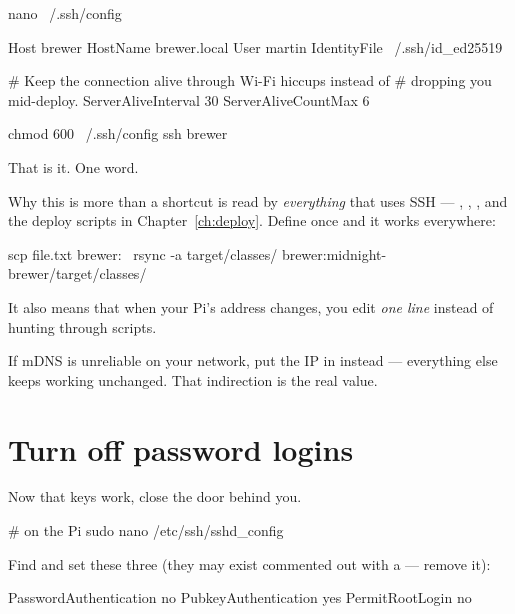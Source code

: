 \begin{shell}
nano ~/.ssh/config
\end{shell}

\begin{trace}
Host brewer
    HostName brewer.local
    User martin
    IdentityFile ~/.ssh/id_ed25519

    # Keep the connection alive through Wi-Fi hiccups instead of
    # dropping you mid-deploy.
    ServerAliveInterval 30
    ServerAliveCountMax 6
\end{trace}

\begin{shell}
chmod 600 ~/.ssh/config
ssh brewer
\end{shell}

That is it. One word.

\begin{concept}{Why this is more than a shortcut}
 is read by \emph{everything} that uses SSH ---
, , , and the deploy scripts in
Chapter~\ref{ch:deploy}. Define  once and it works everywhere:

\begin{shell}
scp file.txt brewer:~
rsync -a target/classes/ brewer:midnight-brewer/target/classes/
\end{shell}

It also means that when your Pi's address changes, you edit \emph{one line}
instead of hunting through scripts.

If mDNS is unreliable on your network, put the IP in  instead ---
everything else keeps working unchanged. That indirection is the real value.
\end{concept}

\section{Turn off password logins}

Now that keys work, close the door behind you.

\begin{shell}
# on the Pi
sudo nano /etc/ssh/sshd_config
\end{shell}

Find and set these three (they may exist commented out with a \code{\#} ---
remove it):

\begin{trace}
PasswordAuthentication no
PubkeyAuthentication yes
PermitRootLogin no
\end{trace}


